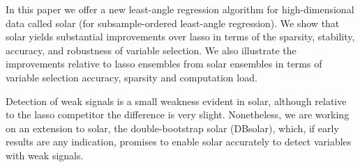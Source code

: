 \documentclass[12pt]{article}
\begin{document}
In this paper we offer a new least-angle regression algorithm for high-dimensional data called solar (for subsample-ordered least-angle regression). We show that solar yields substantial improvements over lasso in terms of the sparsity, stability, accuracy, and robustness of variable selection. We also illustrate the improvements relative to lasso ensembles from solar ensembles in terms of variable selection accuracy, sparsity and computation load.

Detection of weak signals is a small weakness evident in solar, although relative to the lasso competitor the difference is very slight. Nonetheless, we are working on an extension to solar, the double-bootstrap solar (DBsolar), which, if early results are any indication, promises to enable solar accurately to detect variables with weak signals.




\end{document}
